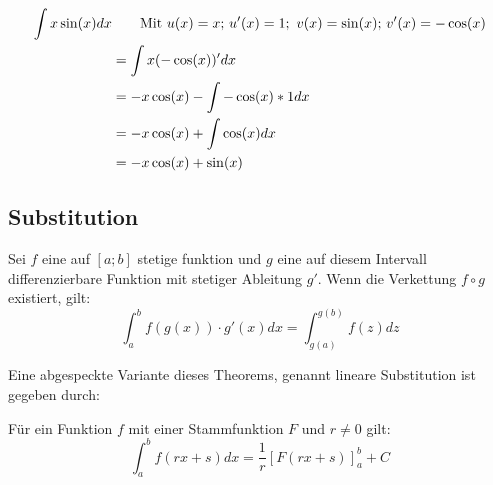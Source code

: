 \documentclass[main.tex]{subfiles}
\begin{document}
\begin{Beispiel}
  \begin{align*}
    \int x\sin(x) dx & \text{\qquad Mit $u(x)=x$; $u'(x)=1$; \,$v(x)=\sin(x)$; $v'(x)=-\cos(x)$}\\
    &= \int x(-\cos(x))' dx\\
    &= -x\cos(x) - \int-\cos(x)*1 dx\\
    &= -x\cos(x) + \int\cos(x) dx\\
    &= -x\cos(x) + \sin(x)
  \end{align*}
\end{Beispiel}


\subsection{Substitution}

\begin{Theorem}
  Sei $f$ eine auf $[a;b]$ stetige funktion und $g$ eine auf diesem Intervall differenzierbare Funktion mit stetiger Ableitung
  $g'$. Wenn die Verkettung $f \circ g$ existiert, gilt:
  $$\int_a^b f(g(x))\cdot g'(x)dx=\int_{g(a)}^{g(b)}f(z)dz$$
\end{Theorem}

Eine abgespeckte Variante dieses Theorems, genannt lineare Substitution ist gegeben durch:

\begin{Theorem}
  Für ein Funktion $f$ mit einer Stammfunktion $F$ und $r\neq 0$ gilt:
  $$\int_a^b f(rx+s)dx=\dfrac{1}{r}[F(rx+s)]_a^b + C$$
\end{Theorem}
\end{document}
